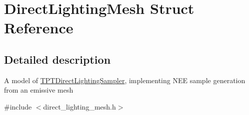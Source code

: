 \hypertarget{struct_direct_lighting_mesh}{}\section{Direct\+Lighting\+Mesh Struct Reference}
\label{struct_direct_lighting_mesh}


\subsection{Detailed description}
A model of \hyperlink{_p_t_lib_page_TPTDirectLightingSampler}{T\+P\+T\+Direct\+Lighting\+Sampler}, implementing N\+EE sample generation from an emissive mesh 

{\ttfamily \#include $<$direct\+\_\+lighting\+\_\+mesh.\+h$>$}

